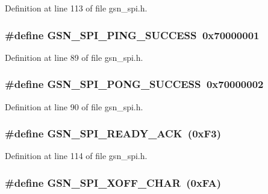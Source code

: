 Definition at line 113 of file gsn\_\-spi.h.

\hypertarget{a00587_a7bb4731e0835beb3f63c02ce467e43a8}{
\subsubsection[{GSN\_\-SPI\_\-PING\_\-SUCCESS}]{\setlength{\rightskip}{0pt plus 5cm}\#define GSN\_\-SPI\_\-PING\_\-SUCCESS~0x70000001}}
\label{a00587_a7bb4731e0835beb3f63c02ce467e43a8}


Definition at line 89 of file gsn\_\-spi.h.

\hypertarget{a00587_afb6d18ccbf76c5a9ab4a6a4c50a397bc}{
\subsubsection[{GSN\_\-SPI\_\-PONG\_\-SUCCESS}]{\setlength{\rightskip}{0pt plus 5cm}\#define GSN\_\-SPI\_\-PONG\_\-SUCCESS~0x70000002}}
\label{a00587_afb6d18ccbf76c5a9ab4a6a4c50a397bc}


Definition at line 90 of file gsn\_\-spi.h.

\hypertarget{a00587_a7e9dabab86b384dbf1dcfe1d8a757b47}{
\subsubsection[{GSN\_\-SPI\_\-READY\_\-ACK}]{\setlength{\rightskip}{0pt plus 5cm}\#define GSN\_\-SPI\_\-READY\_\-ACK~(0xF3)}}
\label{a00587_a7e9dabab86b384dbf1dcfe1d8a757b47}


Definition at line 114 of file gsn\_\-spi.h.

\hypertarget{a00587_ab11cbc78caad6500f4dafc6cce96b333}{
\subsubsection[{GSN\_\-SPI\_\-XOFF\_\-CHAR}]{\setlength{\rightskip}{0pt plus 5cm}\#define GSN\_\-SPI\_\-XOFF\_\-CHAR~(0xFA)}}
\label{a00587_ab11cbc78caad6500f4dafc6cce96b333}


